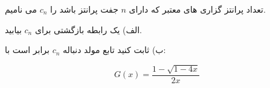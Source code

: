 \exercise
تعداد پرانتز گزاری های معتبر که دارای 
$n$
 جفت پرانتز باشد را 
$c_n$
  می نامیم.
  
  الف) یک رابطه بازگشتی برای 
$c_n$
  بیابید.
  
   ب) ثابت کنید تابع مولد دنباله 
$c_n$
    برابر است با:
    
$$G(x) = \frac{1 - \sqrt{1-4x}}{2x}$$